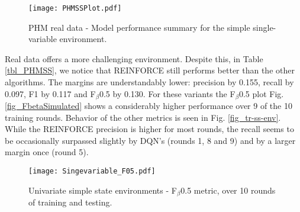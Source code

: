 \documentclass[referee, sn-mathphys-num]{sn-jnl}
\begin{document}
	\begin{figure}[hbt!]
		\centering
		\texttt{[image: PHMSSPlot.pdf]}  
		\caption{PHM real data - Model performance summary for the simple single-variable environment.}
		\label{fig_PHMSS}
	\end{figure}
	Real data offers a more challenging environment. Despite this, in Table \ref{tbl_PHMSS}, we notice that REINFORCE still performs better than the other algorithms. The margins are understandably lower: precision by 0.155, recall by 0.097, F1 by 0.117 and F$_\beta$0.5 by 0.130. For these variants the F$_\beta$0.5 plot Fig. \ref{fig_FbetaSimulated} shows a considerably higher performance over 9 of the 10 training rounds. Behavior of the other metrics is seen in Fig. \ref{fig_tr-ss-env}. While the REINFORCE precision is higher for most rounds, the recall seems to be occasionally surpassed slightly by DQN's (rounds 1, 8 and 9) and by a larger margin once (round 5).
	\begin{figure}[hbt!]
		\centering
		\texttt{[image: Singevariable\_F05.pdf]}  
		\caption{Univariate simple state environments - F$_\beta$0.5 metric, over 10 rounds of training and testing.}
		\label{fig_FbetaPHMSS}
	\end{figure}
	
\end{document}

